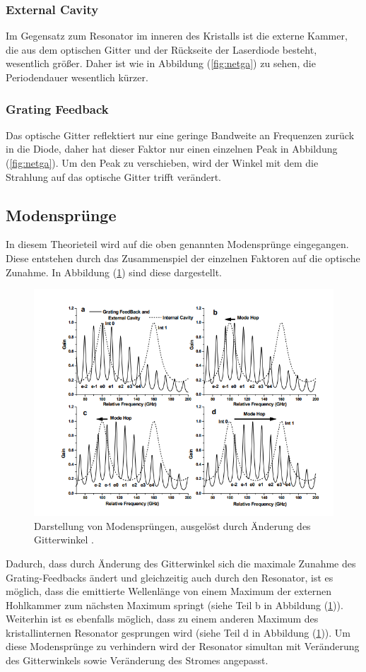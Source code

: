 \subsubsection{External Cavity}
Im Gegensatz zum Resonator im inneren des Kristalls ist die externe Kammer, die aus dem optischen Gitter und der Rückseite der Laserdiode besteht, wesentlich größer. Daher ist wie in Abbildung (\ref{fig:netga}) zu sehen, die Periodendauer wesentlich kürzer.
\subsubsection{Grating Feedback}
Das optische Gitter reflektiert nur eine geringe Bandweite an Frequenzen zurück in die Diode, daher hat dieser Faktor nur einen einzelnen Peak in Abbildung (\ref{fig:netga}). Um den Peak zu verschieben,
wird der Winkel mit dem die Strahlung auf das optische Gitter trifft verändert.
\subsection{Modensprünge}
In diesem Theorieteil wird auf die oben genannten Modensprünge eingegangen. Diese entstehen durch das Zusammenspiel der einzelnen Faktoren auf die optische Zunahme. In Abbildung (\ref{fig:mode}) sind
diese dargestellt.
\begin{figure}[h!]
  \centering
  \includegraphics[scale=0.5]{fig/mode.png}
  \caption{Darstellung von Modensprüngen, ausgelöst durch Änderung des Gitterwinkel \cite[10]{Anleitung}.}
  \label{fig:mode}
\end{figure}
\FloatBarrier
\noindent Dadurch, dass durch Änderung des Gitterwinkel sich die maximale Zunahme des Grating-Feedbacks ändert und gleichzeitig auch durch den Resonator, ist es möglich, dass die
emittierte Wellenlänge von einem Maximum der externen Hohlkammer zum nächsten Maximum springt (siehe Teil b in Abbildung (\ref{fig:mode})). Weiterhin ist es ebenfalls möglich, dass zu einem anderen Maximum des kristallinternen
Resonator gesprungen wird (siehe Teil d in Abbildung (\ref{fig:mode})). Um diese Modensprünge zu verhindern wird der Resonator simultan mit Veränderung des Gitterwinkels sowie Veränderung des Stromes angepasst.
